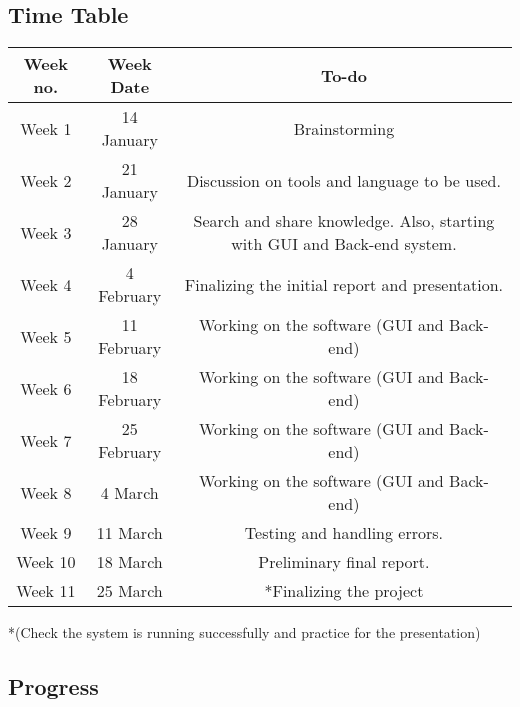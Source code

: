 \documentclass{article}
\begin{document}
\subsection{Time Table}

\begin{center}
\begin{tabular}{ |c|c|c|} 
\hline
\textbf{Week no.} & \textbf{Week Date } & \textbf{To-do } \\ 
\hline
Week 1 & 14 January  & Brainstorming \\ 
\hline
Week 2 & 21 January  & Discussion  on tools and language to be used. \\ 
\hline

Week 3 & 28 January & Search and share knowledge. 
 Also, starting with GUI and Back-end system. 
 \\ 
\hline
Week 4 & 4 February & Finalizing the initial report and presentation.  \\ 
\hline
Week 5 &  11 February & Working on the software (GUI and Back-end)  \\ 
\hline
Week 6 & 18  February & Working on the software (GUI and Back-end)   \\ 
\hline
Week 7 & 25  February & Working on the software (GUI and Back-end)   \\ 
\hline
Week 8 & 4 March  & Working on the software (GUI and Back-end)   \\ 
\hline
Week 9 & 11 March  & Testing and handling errors.   \\ 
\hline
Week 10 & 18 March  & Preliminary final report. \\ 
\hline
Week 11 & 25 March  & *Finalizing the project  \\ 

\hline

\end{tabular}
\end{center}

*(Check the system is running successfully and practice for the presentation) 

\subsection{Progress}
\end{document}

